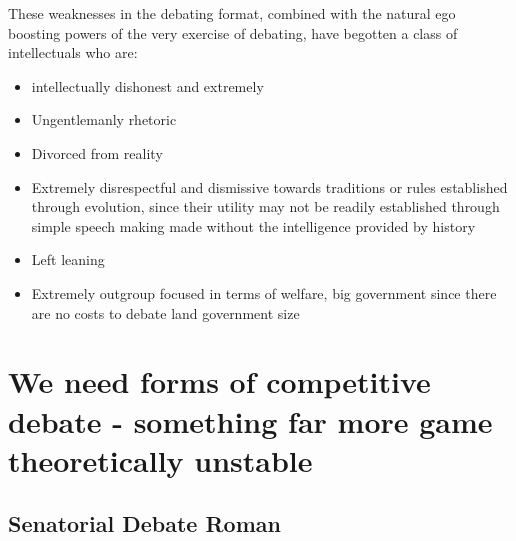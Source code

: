 \documentclass[9pt]{article}
\begin{document}
These weaknesses in the debating format, combined with the natural ego boosting powers of the very exercise of debating, have begotten a class of intellectuals who are:

\begin{itemize}
    \item intellectually dishonest and extremely
    \item Ungentlemanly rhetoric
    \item Divorced from reality
    \item Extremely disrespectful and dismissive towards traditions or rules established through evolution, since their utility may not be readily established through simple speech making made without the intelligence provided by history
    \item Left leaning
    \item Extremely outgroup focused in terms of welfare, big government since there are no costs to debate land government size
\end{itemize}

\section{We need forms of competitive debate - something far more game theoretically unstable}

\subsection{Senatorial Debate Roman}
\end{document}
